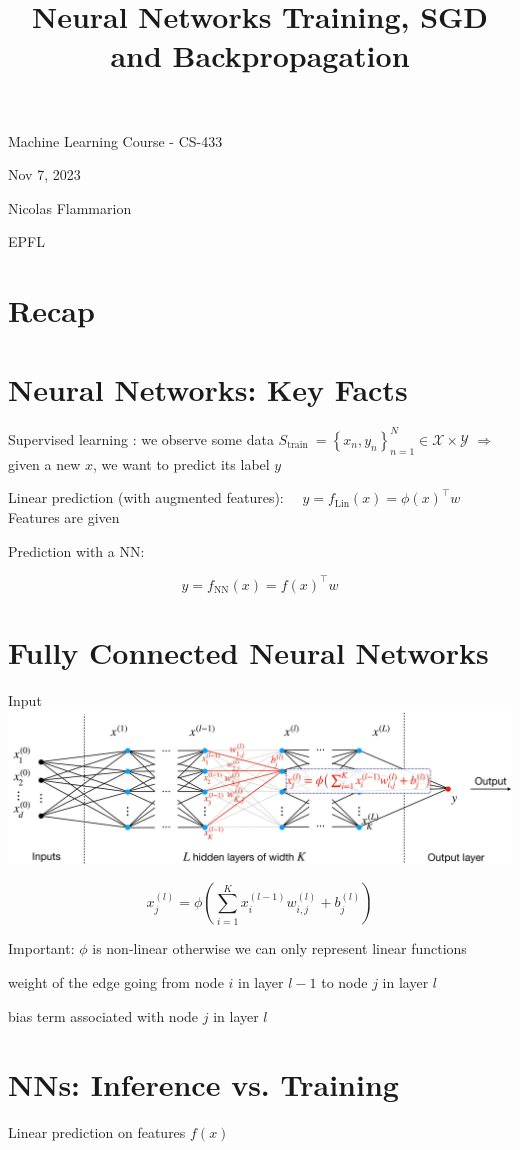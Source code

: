 \documentclass[10pt]{article}
\title{Neural Networks 
 Training, SGD and Backpropagation }
\author{}
\date{}
\begin{document}
\maketitle
Machine Learning Course - CS-433

Nov 7, 2023

Nicolas Flammarion

EPFL

\section*{Recap}
\section*{Neural Networks: Key Facts}
Supervised learning : we observe some data $S_{\text {train }}=\left\{x_{n}, y_{n}\right\}_{n=1}^{N} \in \mathscr{X} \times \mathscr{Y}$ $\Rightarrow$ given a new $x$, we want to predict its label $y$

Linear prediction (with augmented features): $\quad y=f_{\operatorname{Lin}}(x)=\phi(x)^{\top} w$ Features are given

Prediction with a NN:

$$
y=f_{\mathrm{NN}}(x)=f(x)^{\top} w
$$

\section*{Fully Connected Neural Networks}
Input
\includegraphics[max width=\textwidth, center]{2023_12_30_360102aa01a03e5a4270g-04}

$$
x_{j}^{(l)}=\phi\left(\sum_{i=1}^{K} x_{i}^{(l-1)} w_{i, j}^{(l)}+b_{j}^{(l)}\right)
$$

Important: $\phi$ is non-linear otherwise we can only represent linear functions

weight of the edge going from node $i$ in layer $l-1$ to node $j$ in layer $l$

bias term associated with node $j$ in layer $l$

\section*{NNs: Inference vs. Training}
Linear prediction on features $f(x)$
\end{document}
